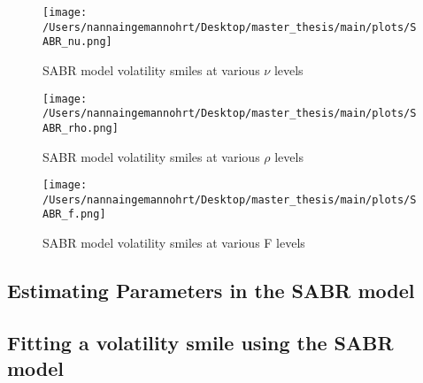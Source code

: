 \begin{figure}[htbp]
    \centering
    \texttt{[image: /Users/nannaingemannohrt/Desktop/master\_thesis/main/plots/SABR\_nu.png]}
    \caption{SABR model volatility smiles at various $\nu$ levels}
    \label{fig:nu}
\end{figure}

\begin{figure}[htbp]
    \centering
    \texttt{[image: /Users/nannaingemannohrt/Desktop/master\_thesis/main/plots/SABR\_rho.png]}
    \caption{SABR model volatility smiles at various $\rho$ levels}
    \label{fig:rho}
\end{figure}

\begin{figure}[htbp]
    \centering
    \texttt{[image: /Users/nannaingemannohrt/Desktop/master\_thesis/main/plots/SABR\_f.png]}
    \caption{SABR model volatility smiles at various F levels}
    \label{fig:f}
\end{figure}

\newpage
\subsection{Estimating Parameters in the SABR model}
\subsection{Fitting a volatility smile using the SABR model}